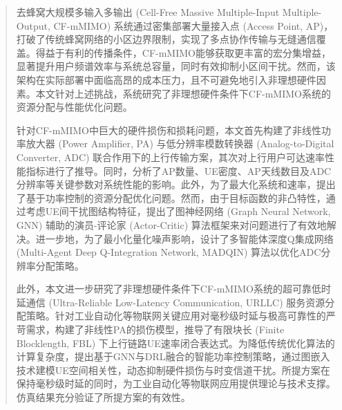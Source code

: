 \begin{abstract}
去蜂窝大规模多输入多输出 (Cell-Free Massive Multiple-Input Multiple-Output, CF-mMIMO) 系统通过密集部署大量接入点 (Access Point, AP)，打破了传统蜂窝网络的小区边界限制，实现了多点协作传输与无缝通信覆盖。得益于有利的传播条件，CF-mMIMO能够获取更丰富的宏分集增益，显著提升用户频谱效率与系统总容量，同时有效抑制小区间干扰。然而，该架构在实际部署中面临高昂的成本压力，且不可避免地引入非理想硬件因素。本文针对上述挑战，系统研究了非理想硬件条件下CF-mMIMO系统的资源分配与性能优化问题。

针对CF-mMIMO中巨大的硬件损伤和损耗问题，本文首先构建了非线性功率放大器 (Power Amplifier, PA) 与低分辨率模数转换器 (Analog-to-Digital Converter, ADC) 联合作用下的上行传输方案，其次对上行用户可达速率性能指标进行了推导。同时，分析了AP数量、UE密度、AP天线数目及ADC分辨率等关键参数对系统性能的影响。此外，为了最大化系统和速率，提出了基于功率控制的资源分配优化问题。然而，由于目标函数的非凸特性，通过考虑UE间干扰图结构特征，提出了图神经网络 (Graph Neural Network, GNN) 辅助的演员-评论家 (Actor-Critic) 算法框架来对问题进行了有效地解决。进一步地，为了最小化量化噪声影响，设计了多智能体深度Q集成网络 (Multi-Agent Deep Q-Integration Network, MADQIN) 算法以优化ADC分辨率分配策略。

此外，本文进一步研究了非理想硬件条件下CF-mMIMO系统的超可靠低时延通信 (Ultra-Reliable Low-Latency Communication, URLLC) 服务资源分配策略。针对工业自动化等物联网关键应用对毫秒级时延与极高可靠性的严苛需求，构建了非线性PA的损伤模型，推导了有限块长 (Finite Blocklength, FBL) 下上行链路UE速率闭合表达式。为降低传统优化算法的计算复杂度，提出基于GNN与DRL融合的智能功率控制策略，通过图嵌入技术建模UE空间相关性，动态抑制硬件损伤与时变信道干扰。所提方案在保持毫秒级时延的同时，为工业自动化等物联网应用提供理论与技术支撑。仿真结果充分验证了所提方案的有效性。

\end{abstract}


